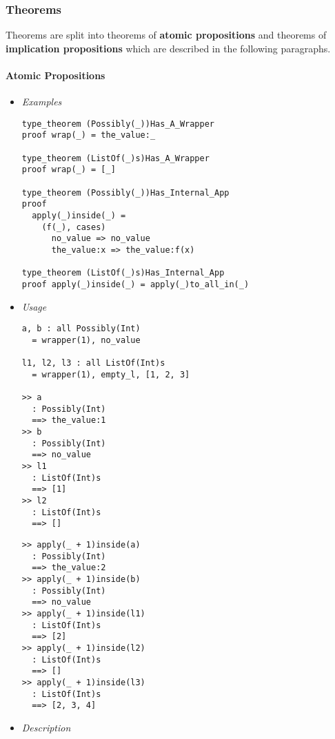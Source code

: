 \documentclass{article}
\begin{document}
\newpage

\subsubsection{Theorems}
\label{subsubsec:ttheo}

Theorems are split into theorems of \textbf{atomic propositions} and
theorems of \textbf{implication propositions} which are described in the
following paragraphs.

\paragraph{Atomic Propositions}

\begin{itemize}
\item \textit{Examples}

\begin{verbatim}
type_theorem (Possibly(_))Has_A_Wrapper
proof wrap(_) = the_value:_

type_theorem (ListOf(_)s)Has_A_Wrapper
proof wrap(_) = [_]

type_theorem (Possibly(_))Has_Internal_App
proof
  apply(_)inside(_) =
    (f(_), cases)
      no_value => no_value
      the_value:x => the_value:f(x)

type_theorem (ListOf(_)s)Has_Internal_App
proof apply(_)inside(_) = apply(_)to_all_in(_)
\end{verbatim}

\item \textit{Usage}

\begin{verbatim}
a, b : all Possibly(Int)
  = wrapper(1), no_value

l1, l2, l3 : all ListOf(Int)s
  = wrapper(1), empty_l, [1, 2, 3]

>> a
  : Possibly(Int)
  ==> the_value:1
>> b
  : Possibly(Int)
  ==> no_value
>> l1
  : ListOf(Int)s
  ==> [1]
>> l2
  : ListOf(Int)s
  ==> []
\end{verbatim}
\newpage
\begin{verbatim}
>> apply(_ + 1)inside(a)
  : Possibly(Int)
  ==> the_value:2
>> apply(_ + 1)inside(b)
  : Possibly(Int)
  ==> no_value
>> apply(_ + 1)inside(l1)
  : ListOf(Int)s
  ==> [2]
>> apply(_ + 1)inside(l2)
  : ListOf(Int)s
  ==> []
>> apply(_ + 1)inside(l3)
  : ListOf(Int)s
  ==> [2, 3, 4]
\end{verbatim}

\item \textit{Description}


\end{itemize}
\end{document}
